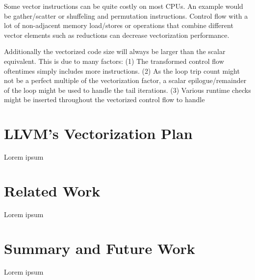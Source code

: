 \documentclass[sigplan,11pt,nonacm]{acmart}
\begin{document}
Some vector instructions can be quite costly on most CPUs. An example would be gather/scatter
or shuffeling and permutation instructions. Control flow with a lot of non-adjacent 
memory load/stores or operations that combine different vector elements such as reductions
can decrease vectorization performance.

Additionally the vectorized code size will always be larger than the scalar equivalent. This is
due to many factors: (1) The transformed control flow oftentimes simply includes more instructions.
(2) As the loop trip count might not be a perfect multiple of the vectorization factor, a scalar
epilogue/remainder of the loop might be used to handle the tail iterations. (3) Various runtime
checks might be inserted throughout the vectorized control flow to handle 





\section{LLVM's Vectorization Plan}
\label{sec:vplan}
Lorem ipsum




\section{Related Work}
\label{sec:relatedwork}
Lorem ipsum




\section{Summary and Future Work}
\label{sec:summary}
Lorem ipsum




\end{document}
